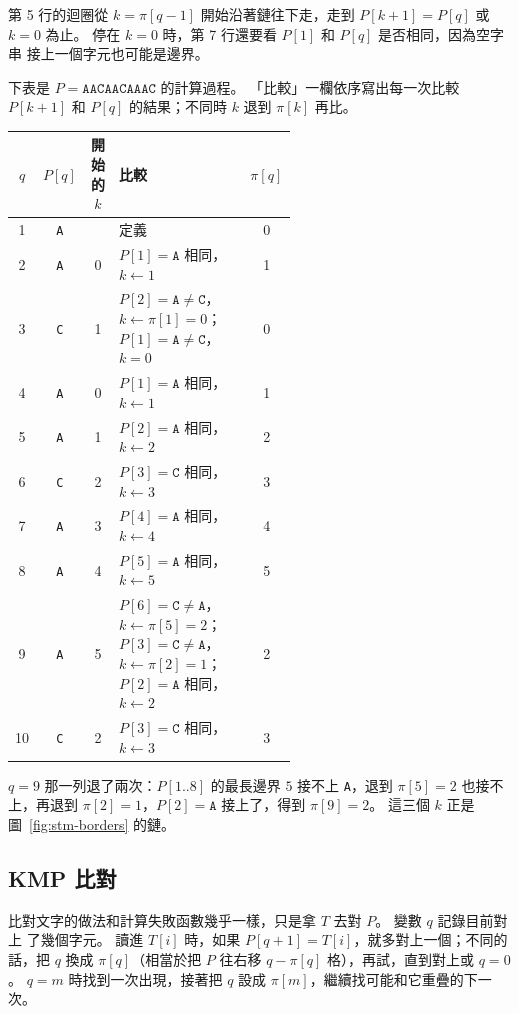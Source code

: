 第 5 行的迴圈從 $k = \pi[q - 1]$ 開始沿著鏈往下走，走到 $P[k + 1] = P[q]$ 或
$k = 0$ 為止。 停在 $k = 0$ 時，第 7 行還要看 $P[1]$ 和 $P[q]$ 是否相同，因為空字串
接上一個字元也可能是邊界。

下表是 $P = \mathtt{AACAACAAAC}$ 的計算過程。 「比較」一欄依序寫出每一次比較
$P[k + 1]$ 和 $P[q]$ 的結果；不同時 $k$ 退到 $\pi[k]$ 再比。

\begin{center}
\small
\begin{tabular}{ccc>{\raggedright\arraybackslash}p{0.56\linewidth}c}
\toprule
$q$ & $P[q]$ & 開始的 $k$ & 比較 & $\pi[q]$ \\
\midrule
1 & \texttt{A} & & 定義 & 0 \\
2 & \texttt{A} & 0 & $P[1]=\mathtt{A}$ 相同，$k\gets1$ & 1 \\
3 & \texttt{C} & 1 & $P[2]=\mathtt{A}\ne\mathtt{C}$，$k\gets\pi[1]=0$；$P[1]=\mathtt{A}\ne\mathtt{C}$，$k=0$ & 0 \\
4 & \texttt{A} & 0 & $P[1]=\mathtt{A}$ 相同，$k\gets1$ & 1 \\
5 & \texttt{A} & 1 & $P[2]=\mathtt{A}$ 相同，$k\gets2$ & 2 \\
6 & \texttt{C} & 2 & $P[3]=\mathtt{C}$ 相同，$k\gets3$ & 3 \\
7 & \texttt{A} & 3 & $P[4]=\mathtt{A}$ 相同，$k\gets4$ & 4 \\
8 & \texttt{A} & 4 & $P[5]=\mathtt{A}$ 相同，$k\gets5$ & 5 \\
9 & \texttt{A} & 5 & $P[6]=\mathtt{C}\ne\mathtt{A}$，$k\gets\pi[5]=2$；$P[3]=\mathtt{C}\ne\mathtt{A}$，$k\gets\pi[2]=1$；$P[2]=\mathtt{A}$ 相同，$k\gets2$ & 2 \\
10 & \texttt{C} & 2 & $P[3]=\mathtt{C}$ 相同，$k\gets3$ & 3 \\
\bottomrule
\end{tabular}
\end{center}

$q = 9$ 那一列退了兩次：$P[1..8]$ 的最長邊界 $5$ 接不上 \texttt{A}，退到 $\pi[5] = 2$
也接不上，再退到 $\pi[2] = 1$，$P[2] = \mathtt{A}$ 接上了，得到 $\pi[9] = 2$。 這三個
$k$ 正是圖~\ref{fig:stm-borders} 的鏈。

\subsection{KMP 比對}

比對文字的做法和計算失敗函數幾乎一樣，只是拿 $T$ 去對 $P$。 變數 $q$ 記錄目前對上
了幾個字元。 讀進 $T[i]$ 時，如果 $P[q + 1] = T[i]$，就多對上一個；不同的話，把 $q$
換成 $\pi[q]$（相當於把 $P$ 往右移 $q - \pi[q]$ 格），再試，直到對上或 $q = 0$。
$q = m$ 時找到一次出現，接著把 $q$ 設成 $\pi[m]$，繼續找可能和它重疊的下一次。

